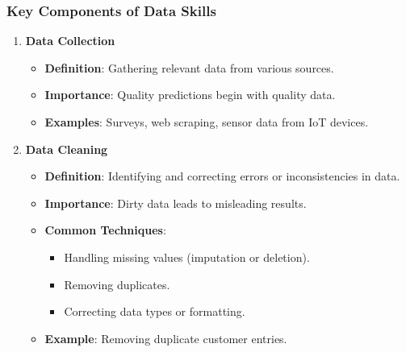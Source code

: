 \documentclass[aspectratio=169]{beamer}
\begin{document}
\begin{frame}[fragile]
    \frametitle{Key Components of Data Skills}
    \begin{enumerate}
        \item \textbf{Data Collection}
            \begin{itemize}
                \item \textbf{Definition}: Gathering relevant data from various sources.
                \item \textbf{Importance}: Quality predictions begin with quality data.
                \item \textbf{Examples}: Surveys, web scraping, sensor data from IoT devices.
            \end{itemize}
            
        \item \textbf{Data Cleaning}
            \begin{itemize}
                \item \textbf{Definition}: Identifying and correcting errors or inconsistencies in data.
                \item \textbf{Importance}: Dirty data leads to misleading results.
                \item \textbf{Common Techniques}:
                    \begin{itemize}
                        \item Handling missing values (imputation or deletion).
                        \item Removing duplicates.
                        \item Correcting data types or formatting.
                    \end{itemize}
                \item \textbf{Example}: Removing duplicate customer entries.
            \end{itemize}
    \end{enumerate}
\end{frame}
\end{document}
